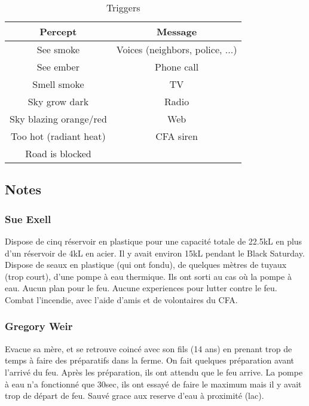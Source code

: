         \begin{table}[!ht]
            \caption{Triggers}
            \label{tab:1}
            \begin{tabular}{|c|c|}
                \hline
                Percept & Message \\
                \hline
                See smoke & Voices (neighbors, police, ...)\\
                See ember & Phone call \\
                Smell smoke & TV \\
                Sky grow dark & Radio \\
                Sky blazing orange/red & Web \\
                Too hot (radiant heat)& CFA siren \\
                Road is blocked & \\
                \hline
            \end{tabular}
        \end{table}

        \subsection{Notes}

            \subsubsection{Sue Exell}
                Dispose de cinq réservoir en plastique pour une capacité totale de 22.5kL en plus d'un réservoir de 4kL en acier.
                Il y avait environ 15kL pendant le Black Saturday.
                Dispose de seaux en plastique (qui ont fondu), de quelques mètres de tuyaux (trop court), d'une pompe à eau thermique.
                Ils ont sorti au cas où la pompe à eau.
                Aucun plan pour le feu.
                Aucune experiences pour lutter contre le feu.
                Combat l'incendie, avec l'aide d'amis et de volontaires du CFA.

            \subsubsection{Gregory Weir}
                Evacue sa mère, et se retrouve coincé avec son fils (14 ans) en prenant trop de temps à faire des préparatifs dans la ferme.
                On fait quelques préparation avant l'arrivé du feu.
                Après les préparation, ils ont attendu que le feu arrive.
                La pompe à eau n'a fonctionné que 30sec, ils ont essayé de faire le maximum mais il y avait trop de départ de feu.
                Sauvé grace aux reserve d'eau à proximité (lac).

